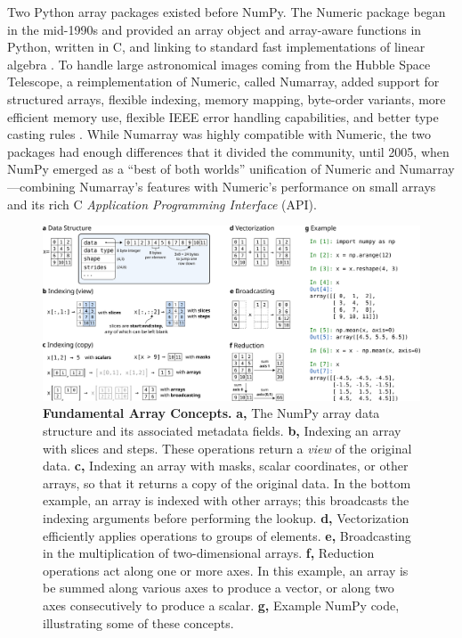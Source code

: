 Two Python array packages existed before NumPy.
The Numeric package began in the mid-1990s and provided an array object and array-aware functions
in Python, written in C, and linking to standard fast implementations of linear
algebra \cite{Numericmanual}.
To handle large astronomical images coming from the Hubble Space Telescope,
a reimplementation of Numeric, called Numarray, added
support for structured arrays, flexible indexing, memory mapping, byte-order variants,
more efficient memory use, flexible IEEE error handling capabilities, and
better type casting rules \cite{greenfield2003numarray}.
While Numarray was highly compatible with Numeric, the two packages
had enough differences that it divided the community, until
2005, when NumPy emerged as a ``best of both worlds'' unification of Numeric
and Numarray \cite{oliphant2006guide}---combining Numarray's features with Numeric's
performance on small arrays and its rich C \emph{Application Programming Interface} (API).

\begin{figure}[h]
  \centering
  \includegraphics[width=\textwidth]{static/sketches/concepts}
  \caption{\textbf{Fundamental Array Concepts.}
    \textbf{a,} The NumPy array data structure and its associated metadata fields.
    \textbf{b,} Indexing an array with slices and steps. These
  operations return a \emph{view} of the original data.
    \textbf{c,} Indexing an array with masks, scalar coordinates, or
  other arrays, so that it returns a copy of the original data. In the
  bottom example, an array is indexed with other arrays; this broadcasts the indexing arguments before performing the lookup.
    \textbf{d,} Vectorization efficiently applies operations to groups
  of elements.
    \textbf{e,} Broadcasting in the multiplication of two-dimensional arrays.
    \textbf{f,} Reduction operations act along one or more axes. In this
    example, an array is be summed along various axes to produce a vector, or along two axes consecutively to
    produce a scalar.
    \textbf{g,} Example NumPy code, illustrating some of these concepts.
   }
  \label{fig:array-concepts}
\end{figure}

